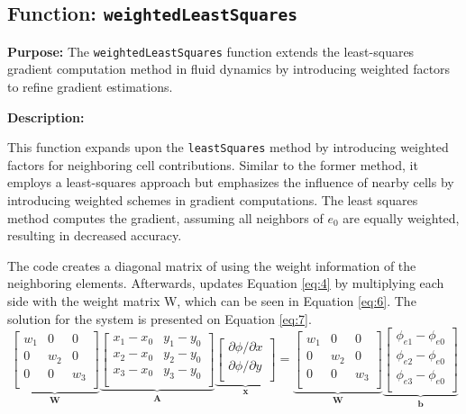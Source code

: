 \documentclass{article}
\begin{document}
\subsection{Function: \texttt{weightedLeastSquares}}
\textbf{Purpose:}
The \texttt{weightedLeastSquares} function extends the least-squares gradient computation method in fluid dynamics by introducing weighted factors to refine gradient estimations.

\textbf{Description:}

This function expands upon the \texttt{leastSquares} method by introducing weighted factors for neighboring cell contributions. Similar to the former method, it employs a least-squares approach but emphasizes the influence of nearby cells by introducing weighted schemes in gradient computations. The least squares method computes the gradient, assuming all neighbors of $e_0$ are equally weighted, resulting in decreased accuracy.

The code creates a diagonal matrix of using the weight information of the neighboring elements. Afterwards, updates Equation \ref{eq:4} by multiplying each side with the weight matrix W, which can be seen in Equation \ref{eq:6}. The solution for the system is presented on Equation \ref{eq:7}.
\begin{equation}
\underbrace{
\begin{bmatrix}
w_1 & 0 & 0 \\
0 & w_2 & 0 \\
0 & 0 & w_3 \\
\end{bmatrix}
}_{\mathbf{W}}
\underbrace{
\begin{bmatrix}
x_1 - x_0 & y_1 - y_0 \\
x_2 - x_0 & y_2 - y_0 \\
x_3 - x_0 & y_3 - y_0 \\
\end{bmatrix}
}_{\mathbf{A}}
\underbrace{
\begin{bmatrix}
\partial \phi / \partial x \\
\partial \phi / \partial y \\
\end{bmatrix}
}_{\mathbf{x}}
=
\underbrace{
\begin{bmatrix}
w_1 & 0 & 0 \\
0 & w_2 & 0 \\
0 & 0 & w_3 \\
\end{bmatrix}
}_{\mathbf{W}}
\underbrace{
\begin{bmatrix}
\phi_{e1} - \phi_{e0} \\
\phi_{e2} - \phi_{e0} \\
\phi_{e3} - \phi_{e0} \\
\end{bmatrix}
}_{\mathbf{b}}
\label{eq:6}
\end{equation}
\end{document}
